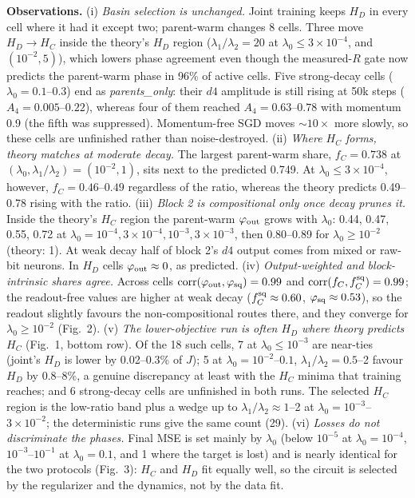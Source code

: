 \documentclass[10pt]{article}
\begin{document}
\textbf{Observations.}
(i) \emph{Basin selection is unchanged.}  Joint training keeps $H_D$ in every cell where it
had it except two; parent-warm changes 8 cells.  Three move $H_D\to H_C$ inside the theory's
$H_D$ region ($\lambda_1/\lambda_2=20$ at $\lambda_0\le3\times10^{-4}$, and $(10^{-2},5)$), which
lowers phase agreement even though the measured-$R$ gate now predicts the parent-warm phase in
96\% of active cells.  Five strong-decay cells ($\lambda_0=0.1$--$0.3$) end as
\emph{parents\_only}: their $d4$ amplitude is still rising at 50k steps ($A_4=0.005$--$0.22$),
whereas four of them reached $A_4=0.63$--$0.78$ with momentum 0.9 (the fifth was suppressed).
Momentum-free SGD moves $\sim10\times$ more slowly, so these cells are unfinished rather than
noise-destroyed.
(ii) \emph{Where $H_C$ forms, theory matches at moderate decay.}  The largest parent-warm share,
$f_C=0.738$ at $(\lambda_0,\lambda_1/\lambda_2)=(10^{-2},1)$, sits next to the predicted 0.749.  At
$\lambda_0\le3\times10^{-4}$, however, $f_C=0.46$--$0.49$ regardless of the ratio, whereas the
theory predicts 0.49--0.78 rising with the ratio.
(iii) \emph{Block 2 is compositional only once decay prunes it.}  Inside the theory's $H_C$
region the parent-warm $\varphi_{\rm out}$ grows with $\lambda_0$: 0.44, 0.47, 0.55, 0.72 at
$\lambda_0=10^{-4},3\times10^{-4},10^{-3},3\times10^{-3}$, then 0.80--0.89 for
$\lambda_0\ge10^{-2}$ (theory: 1).  At weak decay half of block 2's $d4$ output comes from
mixed or raw-bit neurons.  In $H_D$ cells $\varphi_{\rm out}\approx0$, as predicted.
(iv) \emph{Output-weighted and block-intrinsic shares agree.}  Across cells
$\mathrm{corr}(\varphi_{\rm out},\varphi_{\rm sq})=0.99$ and $\mathrm{corr}(f_C,f_C^{\rm sq})=0.99$; the
readout-free values are higher at weak decay ($f_C^{\rm sq}\approx0.60$, $\varphi_{\rm sq}\approx0.53$),
so the readout slightly favours the non-compositional routes there, and they converge for
$\lambda_0\ge10^{-2}$ (Fig.~2).
(v) \emph{The lower-objective run is often $H_D$ where theory predicts $H_C$} (Fig.~1, bottom
row).  Of the 18 such cells, 7 at $\lambda_0\le10^{-3}$ are near-ties (joint's $H_D$ is lower by
0.02--0.3\% of $J$); 5 at $\lambda_0=10^{-2}$--$0.1$, $\lambda_1/\lambda_2=0.5$--2 favour $H_D$ by
0.8--8\%, a genuine discrepancy at least with the $H_C$ minima that training reaches; and 6
strong-decay cells are unfinished in both runs.  The selected $H_C$ region is the
low-ratio band plus a wedge up to $\lambda_1/\lambda_2\approx1$--2 at
$\lambda_0=10^{-3}$--$3\times10^{-2}$; the deterministic runs give the same count (29).
(vi) \emph{Losses do not discriminate the phases.}  Final MSE is set mainly by $\lambda_0$ (below
$10^{-5}$ at $\lambda_0=10^{-4}$, $10^{-3}$--$10^{-1}$ at $\lambda_0=0.1$, and 1 where the target is
lost) and is nearly identical for the two protocols (Fig.~3): $H_C$ and $H_D$ fit equally well, so
the circuit is selected by the regularizer and the dynamics, not by the data fit.
\end{document}
